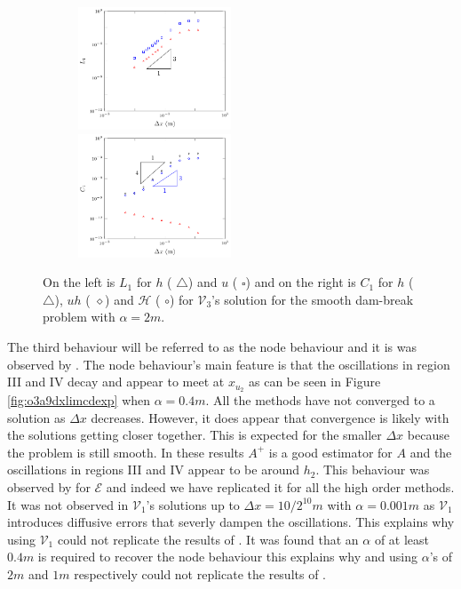 \documentclass[SingleSpace,12pt,Proceedings]{Serre_ASCE}
\begin{document}
\begin{figure}
	\centering
\begin{subfigure}{\textwidth}
	\includegraphics[width=0.5\textwidth]{pics/results/SDB/Lcon/alpha0.5/1.pdf}
	\includegraphics[width=0.5\textwidth]{pics/results/SDB/Con/6.pdf}
\end{subfigure}
	\caption{On the left is $L_1$ for $h$ ({\color{red} $\triangle$}) and $u$ ({\color{blue} $\square$}) and on the right is $C_1$ for $h$ ({\color{red} $\triangle$}), $uh$ ({\color{black} $\diamond$}) and $\mathcal{H}$ ({\color{blue} $\circ$}) for $\mathcal{V}_3$'s solution for the smooth dam-break problem with $\alpha = 2m$.}
	\label{fig:o3a2dxlimmeasure}
\end{figure}

The third behaviour will be referred to as the node behaviour and it is was observed by . The node behaviour's main feature is that the oscillations in region III and IV decay and appear to meet at $x_{u_2}$ as can be seen in Figure \ref{fig:o3a9dxlimcdexp} when $\alpha = 0.4m$. All the methods have not converged to a solution as $\Delta x$ decreases. However, it does appear that convergence is likely with the solutions getting closer together. This is expected for the smaller $\Delta x$ because the problem is still smooth. In these results $A^+$ is a good estimator for $A$ and the oscillations in regions III and IV appear to be around $h_2$. This behaviour was observed by  for $\mathcal{E}$ and indeed we have replicated it for all the high order methods. It was not observed in $\mathcal{V}_1$'s solutions up to $\Delta x=10/2^{10}m$ with $\alpha=0.001m$ as $\mathcal{V}_1$ introduces diffusive errors that severly dampen the oscillations. This explains why  using $\mathcal{V}_1$ could not replicate the results of . It was found that an $\alpha$ of at least $0.4m$ is required to recover the node behaviour this explains why  and  using $\alpha$'s of $2m$ and $1m$ respectively could not replicate the results of . 
\end{document}
